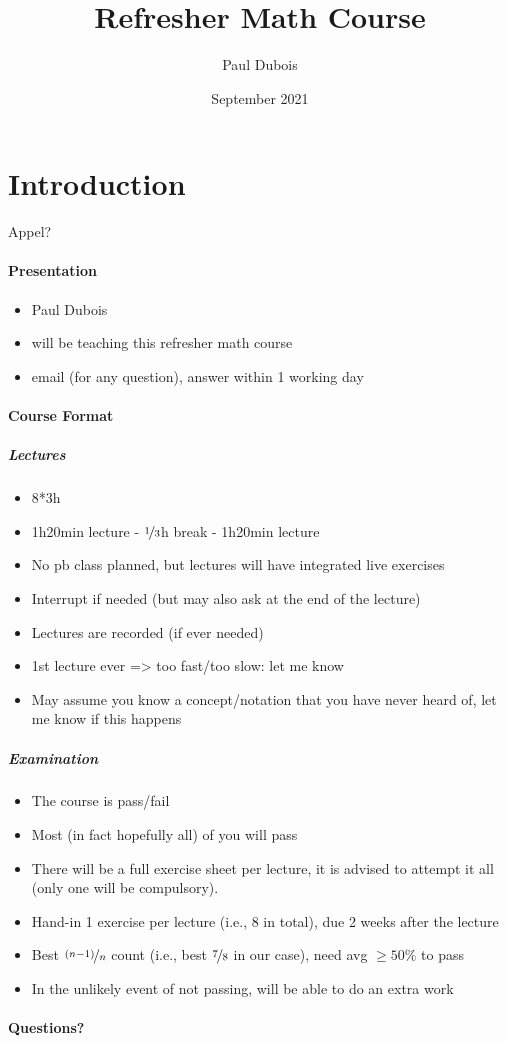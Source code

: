 \documentclass[11pt,a4paper]{report}
\title{Refresher Math Course}
\author{Paul Dubois}
\date{September 2021}
\begin{document}
	\maketitle
	\tableofcontents
	\newpage
	
	\section*{Introduction}
	Appel?
	\paragraph{Presentation}
	\begin{itemize}
		\item Paul Dubois
		\item will be teaching this refresher math course
		\item email (for any question), answer within 1 working day
	\end{itemize}
	\paragraph{Course Format}
	\subparagraph{Lectures}
	\begin{itemize}
		\item 8*3h
		\item 1h20min lecture - $\nicefrac{1}{3}$h break - 1h20min lecture
		\item No pb class planned, but lectures will have integrated live exercises
		\item Interrupt if needed (but may also ask at the end of the lecture)
		\item Lectures are recorded (if ever needed)
		\item 1st lecture ever => too fast/too slow: let me know
		\item May assume you know a concept/notation that you have never heard of, let me know if this happens
	\end{itemize}
	\subparagraph{Examination}
	\begin{itemize}
		\item The course is pass/fail
		\item Most (in fact hopefully all) of you will pass
		\item There will be a full exercise sheet per lecture, it is advised to attempt it all (only one will be compulsory).
		\item Hand-in 1 exercise per lecture (i.e., 8 in total), due 2 weeks after the lecture
		\item Best $\nicefrac{(n-1)}{n}$ count (i.e., best $\nicefrac{7}{8}$ in our case), need avg $\geq 50 \%$ to pass
		\item In the unlikely event of not passing, will be able to do an extra work
	\end{itemize}
	\paragraph{Questions?}
	\vspace*{5cm}
	\newpage
	
	
	
	
	
	
	
	
	
	
\end{document}
